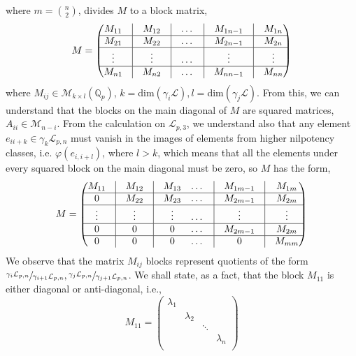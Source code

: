 \documentclass[12pt]{article}
\begin{document}
where $m=\binom{n}{2}$, divides $M$ to a block matrix, $$M=\begin{pmatrix}
M_{11} & \vline & M_{12}&\vline & \dots& \vline & M_{1n-1} & \vline&M_{1n}\\
\hline
M_{21} & \vline & M_{22}&\vline & \dots &\vline & M_{2n-1} &\vline& M_{2n}\\
\hline
\vdots & \vline & \vdots&\vline & \dots &\vline & \vdots &\vline& \vdots\\
\hline
M_{n1} & \vline & M_{n2}&\vline & \dots &\vline & M_{nn-1} &\vline& M_{nn}\\
\end{pmatrix}
$$
where $M_{ij}\in\mathcal{M}_{k\times l}(\mathbb{Q}_p)$, $k=$dim$(\gamma_i\mathcal{L}),l=$dim$(\gamma_j\mathcal{L})$. From this, we can understand that the blocks on the main diagonal of $M$ are squared matrices, $A_{ii}\in\mathcal{M}_{n-i}$. From the calculation on $\mathcal{L}_{p,3}$, we understand also that any element $e_{ii+k}\in\gamma_k\mathcal{L}_{p,n}$ must vanish in the images of elements from higher nilpotency classes, i.e. $\varphi(e_{i,i+l})$, where $l>k$, which means that all the elements under every squared block on the main diagonal must be zero, so $M$ has the form, $$M=\begin{pmatrix}
M_{11} & \vline & M_{12}&\vline & M_{13} & \dots& \vline & M_{1m-1} & \vline&M_{1m}\\
\hline
0 & \vline & M_{22}&\vline & M_{23} & \dots &\vline & M_{2m-1} &\vline& M_{2m}\\
\hline
\vdots & \vline & \vdots&\vline & \vdots & \dots &\vline & \vdots &\vline& \vdots\\
\hline
0 & \vline & 0&\vline & 0 & \dots &\vline & M_{2m-1} &\vline& M_{2m}\\
\hline
0 & \vline & 0 &\vline & 0 & \dots &\vline & 0 &\vline& M_{mm}\\
\end{pmatrix}
$$
We observe that the matrix $M_{ij}$ blocks represent quotients of the form $\sfrac{\gamma_i\mathcal{L}_{p,n}}{\gamma_{i+1}\mathcal{L}_{p,n}},\sfrac{\gamma_j\mathcal{L}_{p,n}}{\gamma_{j+1}\mathcal{L}_{p,n}}$. We shall state, as a fact, that the block $M_{11}$ is either diagonal or anti-diagonal, i.e., $$M_{11}=\begin{pmatrix}
\lambda_1 & & &\\
& \lambda_2 & &\\
& & \ddots &\\
& & & \lambda_n\\
\end{pmatrix}$$
\end{document}
